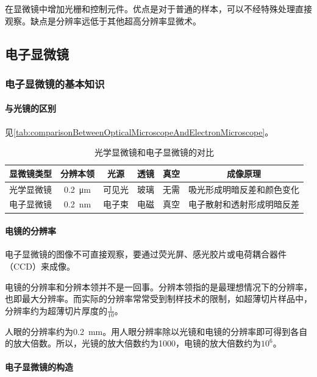 在显微镜中增加光栅和控制元件。优点是对于普通的样本，可以不经特殊处理直接观察。缺点是分辨率远低于其他超高分辨率显微术。

\subsection{电子显微镜}

\subsubsection{电子显微镜的基本知识}

\paragraph{与光镜的区别}

见\autoref{tab:comparisonBetweenOpticalMicroscopeAndElectronMicroscope}。

\begin{table}[htbp]
	\centering
	\begin{tabularx}{\textwidth}{|c|c|c|c|c|C|}
		\hline
		显微镜类型 & 分辨本领 & 光源 & 透镜 & 真空 & 成像原理 \\ \hline
		光学显微镜 & \SI{0.2}{\um} & 可见光 & 玻璃 & 无需 & 吸光形成明暗反差和颜色变化 \\ \hline
		电子显微镜 & \SI{0.2}{\nm} & 电子束 & 电磁 & 真空 & 电子散射和透射形成明暗反差 \\ \hline
	\end{tabularx}
	\caption{光学显微镜和电子显微镜的对比}
	\label{tab:comparisonBetweenOpticalMicroscopeAndElectronMicroscope}
\end{table}

\paragraph{电镜的分辨率}

电子显微镜的图像不可直接观察，要通过荧光屏、感光胶片或电荷耦合器件（CCD）来成像。

电镜的分辨率和分辨本领并不是一回事。分辨本领指的是最理想情况下的分辨率，也即最大分辨率。而实际的分辨率常常受到制样技术的限制，如超薄切片样品中，分辨率约为超薄切片厚度的$\frac{1}{10}$。

人眼的分辨率约为\SI{0.2}{\mm}。用人眼分辨率除以光镜和电镜的分辨率即可得到各自的放大倍数。所以，光镜的放大倍数约为1000，电镜的放大倍数约为$10^6$。

\paragraph{电子显微镜的构造}


